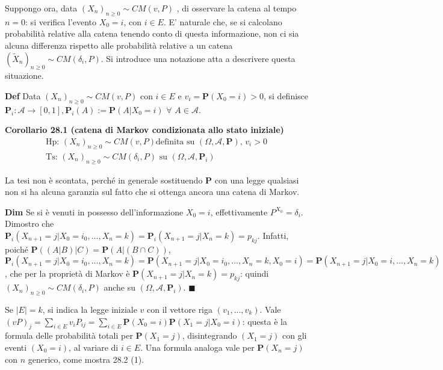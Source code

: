 \documentclass{article}
\begin{document}
Suppongo ora, data $\left( X_{n}\right) _{n\geq 0}\sim CM\left( v,P\right) $%
, di osservare la catena al tempo $n=0$: si verifica l'evento $X_{0}=i$, con 
$i\in E$. E' naturale che, se si calcolano probabilit\`{a} relative alla
catena tenendo conto di questa informazione, non ci sia alcuna differenza
rispetto alle probabilit\`{a} relative a un catena $\left( \tilde{X}%
_{n}\right) _{n\geq 0}\sim CM\left( \delta _{i},P\right) $. Si introduce una
notazione atta a descrivere questa situazione.

\textbf{Def} Data $\left( X_{n}\right) _{n\geq 0}\sim CM\left( v,P\right) $
con $i\in E$ e $v_{i}=\mathbf{P}\left( X_{0}=i\right) >0$, si definisce $%
\mathbf{P}_{i}:\mathcal{A}\rightarrow \left[ 0,1\right] ,\mathbf{P}%
_{i}\left( A\right) :=\mathbf{P}\left( A|X_{0}=i\right) $ $\forall $ $A\in 
\mathcal{A}$.

\textbf{Corollario 28.1 (catena di Markov condizionata allo stato iniziale)}%
\begin{gather*}
\text{Hp: }\left( X_{n}\right) _{n\geq 0}\sim CM\left( v,P\right) \text{
definita su }\left( \Omega ,\mathcal{A},\mathbf{P}\right) \text{, }v_{i}>0 \\
\text{Ts: }\left( X_{n}\right) _{n\geq 0}\sim CM\left( \delta _{i},P\right) 
\text{ su }\left( \Omega ,\mathcal{A},\mathbf{P}_{i}\right)
\end{gather*}

La tesi non \`{e} scontata, perch\'{e} in generale sostituendo $\mathbf{P}$
con una legge qualsiasi non si ha alcuna garanzia sul fatto che si ottenga
ancora una catena di Markov.

\textbf{Dim} Se si \`{e} venuti in possesso dell'informazione $X_{0}=i$,
effettivamente $P^{X_{0}}=\delta _{i}$. Dimostro che $\mathbf{P}_{i}\left(
X_{n+1}=j|X_{0}=i_{0},...,X_{n}=k\right) =\mathbf{P}_{i}\left(
X_{n+1}=j|X_{n}=k\right) =p_{kj}$. Infatti, poich\'{e} $\mathbf{P}\left(
\left( A|B\right) |C\right) =\mathbf{P}\left( A|\left( B\cap C\right)
\right) $, $\mathbf{P}_{i}\left( X_{n+1}=j|X_{0}=i_{0},...,X_{n}=k\right) =%
\mathbf{P}\left( X_{n+1}=j|X_{0}=i_{0},...,X_{n}=k,X_{0}=i\right) =\mathbf{P}%
\left( X_{n+1}=j|X_{0}=i,...,X_{n}=k\right) $, che per la propriet\`{a} di
Markov \`{e} $\mathbf{P}\left( X_{n+1}=j|X_{n}=k\right) =p_{kj}$: quindi $%
\left( X_{n}\right) _{n\geq 0}\sim CM\left( \delta _{i},P\right) $ anche su $%
\left( \Omega ,\mathcal{A},\mathbf{P}_{i}\right) $. $\blacksquare $

Se $\left\vert E\right\vert =k$, si indica la legge iniziale $v$ con il
vettore riga $\left( v_{1},...,v_{k}\right) $. Vale $\left( vP\right)
_{j}=\sum_{i\in E}v_{i}P_{ij}=\sum_{i\in E}\mathbf{P}\left( X_{0}=i\right) 
\mathbf{P}\left( X_{1}=j|X_{0}=i\right) $: questa \`{e} la formula delle
probabilit\`{a} totali per $\mathbf{P}\left( X_{1}=j\right) $, disintegrando 
$\left( X_{1}=j\right) $ con gli eventi $\left( X_{0}=i\right) $, al variare
di $i\in E$. Una formula analoga vale per $\mathbf{P}\left( X_{n}=j\right) $
con $n$ generico, come mostra 28.2 (1).
\end{document}

